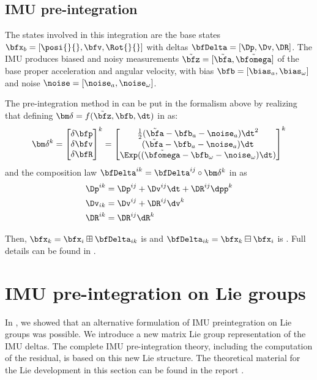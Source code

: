 \subsection{IMU pre-integration}

The states involved in this integration are the base states $\bfx_b = [\posi{}{}, \bfv, \Rot{}{}]$ with deltas $\bfDelta=[\Dp,\Dv,\DR]$. 
The IMU produces biased and noisy measurements $\tilde\bfz = [\tilde\bfa, \tilde{\bfomega}]$ of the base proper acceleration and angular velocity, 
with bias $\bfb = [\bias_{a}, \bias_{\omega}]$ and noise $\noise = [\noise_{a}, \noise_{\omega}]$. 

The pre-integration method in  \cite{forster2017-TRO} can be put in the formalism above by realizing that defining 
$\bm\delta=f(\tilde\bfz,\bfb,\dt)$ in  as:
%
\begin{align}
    \bm\delta^k = \begin{bmatrix}
    \delta\bfp\\\delta\bfv\\\delta\bfR
    \end{bmatrix}^k =
    \begin{bmatrix}
    \tfrac12(\tilde\bfa-\bfb_a-\noise_a)\dt^2 \\
    (\tilde\bfa-\bfb_a-\noise_a)\dt \\
    \Exp((\tilde{\bfomega}-\bfb_\omega-\noise_\omega)\dt)
    \end{bmatrix}^k
\end{align}
%
and the composition law $\bfDelta^{ik}=\bfDelta^{ij}\circ\bm\delta^k$ in  as
%
\begin{align} \label{eq:composition_delta}
    \begin{split}
    \Dp^{ik} 
    &= \Dp^{ij} + \Dv^{ij}\dt + \DR^{ij}\dpp^{k} \\
    \Dv_{ik} 
    &= \Dv^{ij} + \DR^{ij}\dv^{k} \\
    \DR^{ik} 
    &= \DR^{ij}\dR^{k} 
    \end{split}
\end{align}

Then, $\bfx_k=\bfx_i\boxplus\bfDelta_{ik}$ is \cite[eq.~32]{forster2017-TRO} and $\bfDelta_{ik}=\bfx_k\boxminus\bfx_i$ is \cite[eq.~33]{forster2017-TRO}. 
Full details can be found in \cite[Section 3.4]{atchuthan-18-thesis}.



%
%
%
%
\section{IMU pre-integration on Lie groups}
In \cite{fourmy2019absolute}, we showed that an alternative formulation of IMU preintegration on Lie groups was possible.
We introduce a new matrix Lie group representation of the IMU deltas. The complete IMU pre-integration theory,
including the computation of the residual, is based on this new Lie structure. The theoretical material for the Lie
development in this section can be found in the report \cite{sola2018micro}.

